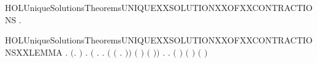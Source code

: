 \newcommand{\HOLUniqueSolutionsTheoremsunfoldingXXlemmaFour}{\UseVerbatim{HOLUniqueSolutionsTheoremsunfoldingXXlemmaFour}}
\begin{SaveVerbatim}{HOLUniqueSolutionsTheoremsUNIQUEXXSOLUTIONXXOFXXCONTRACTIONS}
\HOLTokenTurnstile{} \HOLSymConst{\HOLTokenForall{}}  .
         \HOLSymConst{\HOLTokenConj{}}     \HOLSymConst{\HOLTokenConj{}}     \HOLSymConst{\HOLTokenImp{}}
         
\end{SaveVerbatim}
\newcommand{\HOLUniqueSolutionsTheoremsUNIQUEXXSOLUTIONXXOFXXCONTRACTIONS}{\UseVerbatim{HOLUniqueSolutionsTheoremsUNIQUEXXSOLUTIONXXOFXXCONTRACTIONS}}
\begin{SaveVerbatim}{HOLUniqueSolutionsTheoremsUNIQUEXXSOLUTIONXXOFXXCONTRACTIONSXXLEMMA}
\HOLTokenTurnstile{} \HOLSymConst{\HOLTokenForall{}} .
       \ensuremath{(}\HOLSymConst{\HOLTokenExists{}}.   \HOLSymConst{\HOLTokenConj{}}     \HOLSymConst{\HOLTokenConj{}}    \ensuremath{)} \HOLSymConst{\HOLTokenImp{}}
       \HOLSymConst{\HOLTokenForall{}}.
             \HOLSymConst{\HOLTokenImp{}}
           \ensuremath{(}\HOLSymConst{\HOLTokenForall{}} .
                  \HOLTokenWeakTransBegin{} \HOLTokenWeakTransEnd {} \HOLSymConst{\HOLTokenImp{}}
                \HOLSymConst{\HOLTokenExists{}}.
                      \HOLSymConst{\HOLTokenConj{}}     \HOLSymConst{\HOLTokenConj{}}
                    \ensuremath{(}  \ensuremath{(}\HOLTokenLambda{} .  \HOLTokenWeakTransBegin{} \HOLTokenWeakTransEnd {}\ensuremath{)}\ensuremath{)} \ensuremath{(} \ensuremath{)}
                      \ensuremath{(} \ensuremath{)}\ensuremath{)} \HOLSymConst{\HOLTokenConj{}}
           \HOLSymConst{\HOLTokenForall{}}.
                 \HOLTokenWeakTransBegin\HOLConst{\ensuremath{\tau}}\HOLTokenWeakTransEnd {} \HOLSymConst{\HOLTokenImp{}}
               \HOLSymConst{\HOLTokenExists{}}.
                     \HOLSymConst{\HOLTokenConj{}}     \HOLSymConst{\HOLTokenConj{}}
                   \ensuremath{(}  \ensuremath{)} \ensuremath{(} \ensuremath{)} \ensuremath{(} \ensuremath{)}
\end{SaveVerbatim}
